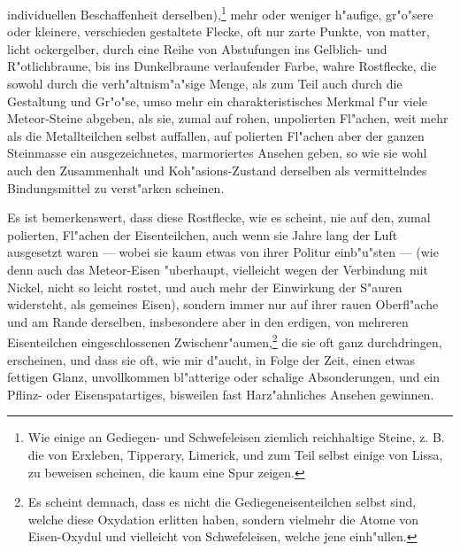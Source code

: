 \documentclass[a4paper, 11pt, oneside, german]{article}
\begin{document}
individuellen Beschaffenheit derselben),\footnote{Wie einige an Gediegen- und Schwefeleisen ziemlich reichhaltige Steine, z. B. die von Erxleben, Tipperary, Limerick, und zum Teil selbst einige von Lissa, zu beweisen scheinen, die kaum eine Spur zeigen.} mehr oder weniger h"aufige, gr"o"sere oder kleinere, verschieden gestaltete Flecke, oft nur zarte Punkte, von matter, licht ockergelber, durch eine Reihe von Abstufungen ins Gelblich- und R"otlichbraune, bis ins Dunkelbraune verlaufender Farbe, wahre Rostflecke, die sowohl durch die verh"altnism"a"sige Menge, als zum Teil auch durch die Gestaltung und Gr"o"se, umso mehr ein charakteristisches Merkmal f"ur viele Meteor-Steine abgeben, als sie, zumal auf rohen, unpolierten Fl"achen, weit mehr als die Metallteilchen selbst auffallen, auf polierten Fl"achen aber der ganzen Steinmasse ein ausgezeichnetes, marmoriertes Ansehen geben, so wie sie wohl auch den Zusammenhalt und Koh"asions-Zustand derselben als vermittelndes Bindungsmittel zu verst"arken scheinen.

Es ist bemerkenswert, dass diese Rostflecke, wie es scheint, nie auf den, zumal polierten, Fl"achen der Eisenteilchen, auch wenn sie Jahre lang der Luft ausgesetzt waren --- wobei sie kaum etwas von ihrer Politur einb"u"sten --- (wie denn auch das Meteor-Eisen "uberhaupt, vielleicht wegen der Verbindung mit Nickel, nicht so leicht rostet, und auch mehr der Einwirkung der S"auren widersteht, als gemeines Eisen), sondern immer nur auf ihrer rauen Oberfl"ache und am Rande derselben, insbesondere aber in den erdigen, von mehreren Eisenteilchen eingeschlossenen Zwischenr"aumen,\footnote{Es scheint demnach, dass es nicht die Gediegeneisenteilchen selbst sind, welche diese Oxydation erlitten haben, sondern vielmehr die Atome von Eisen-Oxydul und vielleicht von Schwefeleisen, welche jene einh"ullen.} die sie oft ganz durchdringen, erscheinen, und dass sie oft, wie mir d"aucht, in Folge der Zeit, einen etwas fettigen Glanz, unvollkommen bl"atterige oder schalige Absonderungen, und ein Pflinz- oder Eisenspatartiges, bisweilen fast Harz"ahnliches Ansehen gewinnen.
\end{document}
